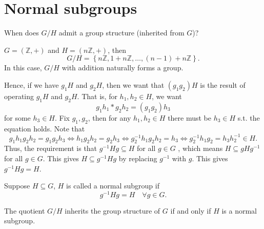 \section{Normal subgroups}
\begin{question}
    When does \(G / H\) admit a group structure (inherited from \(G\))?
\end{question}

\begin{eg}
    \(G = (\mathbb{Z} , +)\) and \(H = (n\mathbb{Z} , +)\), then 
    \[
        G / H = \left\{ n\mathbb{Z} , 1 + n\mathbb{Z} , \dots , (n - 1) + n\mathbb{Z}  \right\}. 
    \]  
    In this case, \(G / H\) with addition naturally forms a group. 
\end{eg}

Hence, if we have \(g_1 H\) and \(g_2 H\), then we want that \((g_1 g_2) H\) is the result of operating \(g_1 H\) and \(g_2 H\). That is, for \(h_1, h_2 \in H\), we want 
\[
    g_1 h_1 * g_2 h_2 = (g_1 g_2) h_3
\] for some \(h_3 \in H\). Fix \(g_1, g_2\), then for any \(h_1, h_2 \in H\) there must be  \(h_3 \in H\) s.t. the equation holds. Note that 
\[
    g_1 h_1 g_2 h_2 = g_1 g_2 h_3 \iff  h_1 g_2 h_2 = g_2 h_3 \iff  g_2^{-1} h_1 g_2 h_2 = h_3 \iff g_2^{-1} h_1 g_2 = h_3 h_2^{-1} \in H.
\] Thus, the requirement is that \(g^{-1} H g \subseteq H\) for all \(g \in G\) , which means \(H \subseteq gHg^{-1} \) for all \(g \in G\). This gives \(H \subseteq g^{-1} H g\) by replacing \(g^{-1} \) with \(g\). This gives \(g^{-1} H g = H\). 

\begin{definition}
    Suppose \(H \subseteq G\), \(H\) is called a normal subgroup if 
    \[
        g^{-1} H g = H \quad \forall g \in G.
    \]
\end{definition}

\begin{theorem} \label{thm: G/H group iff H nomral}
    The quotient \(G / H\) inherits the group structure of \(G\) if and only if \(H\) is a normal subgroup.   
\end{theorem}